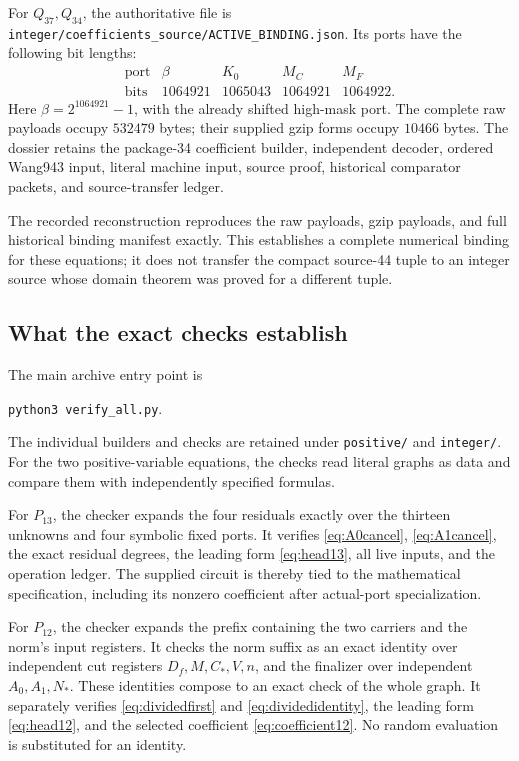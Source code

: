 \documentclass[11pt,a4paper]{article}
\theoremstyle{definition}
\theoremstyle{remark}
\newcommand{\sourcepath}[1]{\texttt{\small #1}}
\begin{document}
For \(Q_{37},Q_{34}\), the authoritative file is
\sourcepath{integer/coefficients\_source/ACTIVE\_BINDING.json}.
Its ports have the following bit lengths:
\[
 \begin{array}{c|rrrr}
 \text{port}&\beta&K_0&M_C&M_F\\ \hline
 \text{bits}&1064921&1065043&1064921&1064922.
 \end{array}
\]
Here \(\beta=2^{1064921}-1\), with the already shifted high-mask port.
The complete raw payloads occupy \(532479\) bytes; their supplied gzip
forms occupy \(10466\) bytes. The dossier retains the package-34
coefficient builder, independent decoder, ordered Wang943 input,
literal machine input, source proof, historical comparator packets,
and source-transfer ledger.

The recorded reconstruction reproduces the raw payloads, gzip payloads,
and full historical binding manifest exactly. This establishes a
complete numerical binding for these equations; it does not transfer the
compact source-44 tuple to an integer source whose domain theorem was
proved for a different tuple.

\subsection{What the exact checks establish}

The main archive entry point is
\begin{center}
\sourcepath{python3 verify\_all.py}.
\end{center}
The individual builders and checks are retained under
\sourcepath{positive/} and \sourcepath{integer/}.
For the two positive-variable equations, the checks read literal graphs
as data and compare them with independently specified formulas.

For \(P_{13}\), the checker expands the four residuals exactly over
the thirteen unknowns and four symbolic fixed ports. It verifies
\eqref{eq:A0cancel}, \eqref{eq:A1cancel}, the exact residual degrees,
the leading form \eqref{eq:head13}, all live inputs, and the operation
ledger. The supplied circuit is thereby tied to the mathematical
specification, including its nonzero coefficient after actual-port
specialization.

For \(P_{12}\), the checker expands the prefix containing the two
carriers and the norm's input registers. It checks the norm suffix
as an exact identity over independent cut registers
\(D_f,M,C_*,V,n\), and the finalizer over independent
\(A_0,A_1,N_*\). These identities compose to an exact check of the
whole graph. It separately verifies \eqref{eq:dividedfirst} and
\eqref{eq:dividedidentity}, the leading form \eqref{eq:head12}, and
the selected coefficient \eqref{eq:coefficient12}.
No random evaluation is substituted for an identity.
\end{document}

